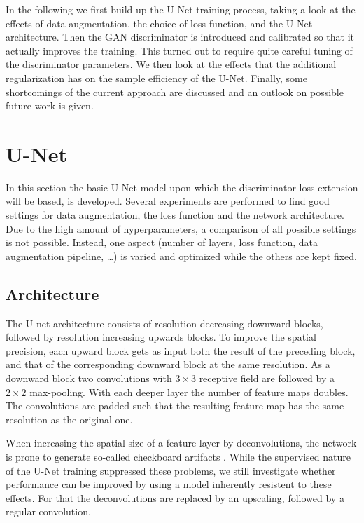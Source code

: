 \documentclass[aps,prl,twocolumn,groupedaddress,amsmath,amssymb]{revtex4-1}
\begin{document}
    In the following we first build up the U-Net training process, taking a look at the effects
    of data augmentation, the choice of loss function, and the U-Net architecture. Then the GAN
    discriminator is introduced and calibrated so that it actually improves the training. This 
    turned out to require quite careful tuning of the discriminator parameters. We then look at the
    effects that the additional regularization has on the sample efficiency of the U-Net. Finally, 
    some shortcomings of the current approach are discussed and an outlook on possible future work 
    is given.

    \section{U-Net}

    In this section the basic U-Net model upon which the discriminator loss extension will be based,
    is developed. Several experiments are performed to find good settings for data augmentation, the
    loss function and the network architecture. Due to the high amount of hyperparameters, a
    comparison of all possible settings is not possible. Instead, one aspect (number of layers,
    loss function, data augmentation pipeline, \ldots) is varied and optimized while the others are
    kept fixed.

    \subsection{Architecture}
    The U-net architecture consists of resolution decreasing downward blocks, followed by resolution
    increasing upwards blocks. To improve the spatial precision, each upward block gets  as input
    both the result of the preceding block, and that of the corresponding downward block at the same
    resolution. As a downward block two convolutions with $3\times3$ receptive field are followed by
    a $2\times2$ max-pooling. With each deeper layer the  number of feature maps doubles. The
    convolutions are padded such that the resulting feature map has the same resolution as the
    original one.

    When increasing the spatial size of a feature layer by deconvolutions, the network is
    prone to generate so-called checkboard artifacts \cite{odena2016deconvolution}. While the 
    supervised nature of the U-Net training suppressed these problems, we still investigate whether
    performance can be improved by using a model inherently resistent to these effects. For that
    the deconvolutions are replaced by an upscaling, followed by a regular convolution. 
\end{document}
